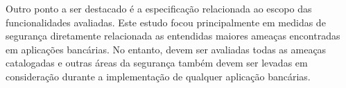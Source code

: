     Outro ponto a ser destacado é a especificação relacionada ao escopo das funcionalidades avaliadas. Este estudo focou principalmente em medidas de segurança diretamente relacionada as entendidas maiores ameaças encontradas em aplicações bancárias. No entanto, devem ser avaliadas todas as ameaças catalogadas e outras áreas da segurança também devem ser levadas em consideração durante a implementação de qualquer aplicação bancárias.